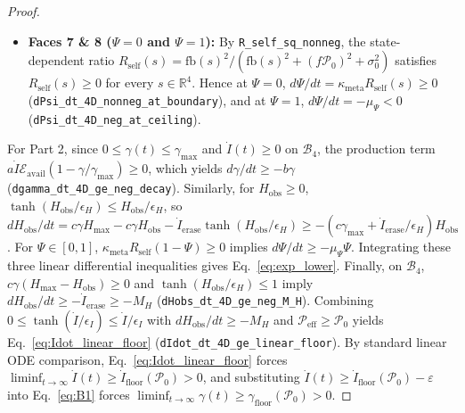 \documentclass[11pt,a4paper]{article}
\theoremstyle{definition}
\begin{document}
\begin{proof}
\begin{itemize}
  \item \textbf{Faces 7 \& 8 ($\Psi = 0$ and $\Psi = 1$):} By \texttt{R\_self\_sq\_nonneg}, the state-dependent ratio $R_{\mathrm{self}}(s) = \mathrm{fb}(s)^2/(\mathrm{fb}(s)^2 + (f\mathcal{P}_0)^2 + \sigma_0^2)$ satisfies $R_{\mathrm{self}}(s) \ge 0$ for every $s \in \mathbb{R}^4$. Hence at $\Psi = 0$, $d\Psi/dt = \kappa_{\mathrm{meta}}R_{\mathrm{self}}(s) \ge 0$ (\texttt{dPsi\_dt\_4D\_nonneg\_at\_boundary}), and at $\Psi = 1$, $d\Psi/dt = -\mu_\Psi < 0$ (\texttt{dPsi\_dt\_4D\_neg\_at\_ceiling}).
\end{itemize}
For Part 2, since $0 \le \gamma(t) \le \gamma_{\max}$ and $\dot{I}(t) \ge 0$ on $\mathcal{B}_4$, the production term $a\dot{I}\mathcal{E}_{\mathrm{avail}}(1 - \gamma/\gamma_{\max}) \ge 0$, which yields $d\gamma/dt \ge -b\gamma$ (\texttt{dgamma\_dt\_4D\_ge\_neg\_decay}). Similarly, for $H_{\mathrm{obs}} \ge 0$, $\tanh(H_{\mathrm{obs}}/\epsilon_H) \le H_{\mathrm{obs}}/\epsilon_H$, so $dH_{\mathrm{obs}}/dt = c\gamma H_{\max} - c\gamma H_{\mathrm{obs}} - \dot{I}_{\mathrm{erase}}\tanh(H_{\mathrm{obs}}/\epsilon_H) \ge -(c\gamma_{\max} + \dot{I}_{\mathrm{erase}}/\epsilon_H)H_{\mathrm{obs}}$. For $\Psi \in [0, 1]$, $\kappa_{\mathrm{meta}}R_{\mathrm{self}}(1-\Psi) \ge 0$ implies $d\Psi/dt \ge -\mu_\Psi\Psi$. Integrating these three linear differential inequalities gives Eq.~\eqref{eq:exp_lower}. Finally, on $\mathcal{B}_4$, $c\gamma(H_{\max} - H_{\mathrm{obs}}) \ge 0$ and $\tanh(H_{\mathrm{obs}}/\epsilon_H) \le 1$ imply $dH_{\mathrm{obs}}/dt \ge -\dot{I}_{\mathrm{erase}} \ge -M_H$ (\texttt{dHobs\_dt\_4D\_ge\_neg\_M\_H}). Combining $0 \le \tanh(\dot{I}/\epsilon_I) \le \dot{I}/\epsilon_I$ with $dH_{\mathrm{obs}}/dt \ge -M_H$ and $\mathcal{P}_{\mathrm{eff}} \ge \mathcal{P}_0$ yields Eq.~\eqref{eq:Idot_linear_floor} (\texttt{dIdot\_dt\_4D\_ge\_linear\_floor}). By standard linear ODE comparison, Eq.~\eqref{eq:Idot_linear_floor} forces $\liminf_{t\to\infty}\dot{I}(t) \ge \dot{I}_{\mathrm{floor}}(\mathcal{P}_0) > 0$, and substituting $\dot{I}(t) \ge \dot{I}_{\mathrm{floor}}(\mathcal{P}_0) - \varepsilon$ into Eq.~\eqref{eq:B1} forces $\liminf_{t\to\infty}\gamma(t) \ge \gamma_{\mathrm{floor}}(\mathcal{P}_0) > 0$.
\end{proof}
\end{document}
